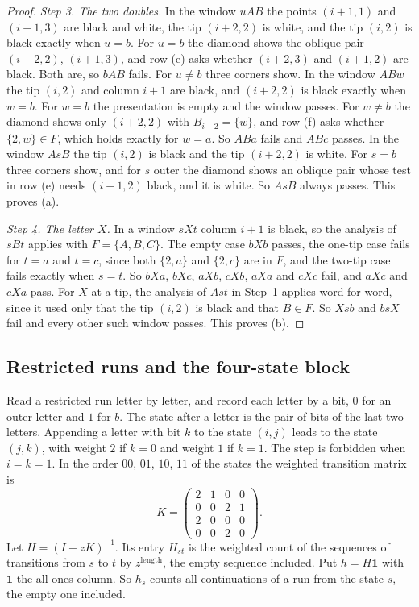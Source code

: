 \begin{proof}
\emph{Step 3. The two doubles.} In the window $uAB$ the points $(i+1,1)$ and $(i+1,3)$ are
black and white, the tip $(i+2,2)$ is white, and the tip $(i,2)$ is black exactly when $u=b$.
For $u=b$ the diamond shows the oblique pair $(i+2,2)$, $(i+1,3)$, and row (e) asks whether
$(i+2,3)$ and $(i+1,2)$ are black. Both are, so $bAB$ fails. For $u\ne b$ three corners show.
In the window $ABw$ the tip $(i,2)$ and column $i+1$ are black, and $(i+2,2)$ is black exactly
when $w=b$. For $w=b$ the presentation is empty and the window passes. For $w\ne b$ the
diamond shows only $(i+2,2)$ with $B_{i+2}=\{w\}$, and row (f) asks whether $\{2,w\}\in F$,
which holds exactly for $w=a$. So $ABa$ fails and $ABc$ passes. In the window $AsB$ the tip
$(i,2)$ is black and the tip $(i+2,2)$ is white. For $s=b$ three corners show, and for $s$
outer the diamond shows an oblique pair whose test in row (e) needs $(i+1,2)$ black, and it
is white. So $AsB$ always passes. This proves (a).

\emph{Step 4. The letter $X$.} In a window $sXt$ column $i+1$ is black, so the analysis of
$sBt$ applies with $F=\{A,B,C\}$. The empty case $bXb$ passes, the one-tip case fails for
$t=a$ and $t=c$, since both $\{2,a\}$ and $\{2,c\}$ are in $F$, and the two-tip case fails
exactly when $s=t$. So $bXa$, $bXc$, $aXb$, $cXb$, $aXa$ and $cXc$ fail, and $aXc$ and $cXa$
pass. For $X$ at a tip, the analysis of $Ast$ in Step~1 applies word for word, since it used
only that the tip $(i,2)$ is black and that $B\in F$. So $Xsb$ and $bsX$ fail and every other
such window passes. This proves (b).
\end{proof}

\subsection{Restricted runs and the four-state block}

Read a restricted run letter by letter, and record each letter by a bit, $0$ for an outer
letter and $1$ for $b$. The state after a letter is the pair of bits of the last two letters.
Appending a letter with bit $k$ to the state $(i,j)$ leads to the state $(j,k)$, with weight
$2$ if $k=0$ and weight $1$ if $k=1$. The step is forbidden when $i=k=1$. In the order $00$,
$01$, $10$, $11$ of the states the weighted transition matrix is
\begin{equation}\label{eq:K}
K=\begin{pmatrix}2&1&0&0\\0&0&2&1\\2&0&0&0\\0&0&2&0\end{pmatrix}.
\end{equation}
Let $H=(I-zK)^{-1}$. Its entry $H_{st}$ is the weighted count of the sequences of
transitions from $s$ to $t$ by $z^{\text{length}}$, the empty sequence included. Put
$h=H\mathbf1$ with $\mathbf1$ the all-ones column. So $h_s$ counts all continuations of a run
from the state $s$, the empty one included.

